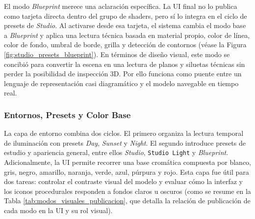 El modo \textit{Blueprint} merece una aclaración específica. La UI final no lo publica como tarjeta directa dentro del grupo de shaders, pero sí lo integra en el ciclo de presets de \textit{Studio}. Al activarse desde esa tarjeta, el sistema cambia el modo base a \textit{Blueprint} y aplica una lectura técnica basada en material propio, color de línea, color de fondo, umbral de borde, grilla y detección de contornos (véase la Figura \ref{fig:studio_presets_blueprint}). En términos de diseño visual, este modo se concibió para convertir la escena en una lectura de planos y siluetas técnicas sin perder la posibilidad de inspección 3D. Por ello funciona como puente entre un lenguaje de representación casi diagramático y el modelo navegable en tiempo real.

\subsubsection{Entornos, Presets y Color Base}

La capa de entorno combina dos ciclos. El primero organiza la lectura temporal de iluminación con presets \textit{Day}, \textit{Sunset} y \textit{Night}. El segundo introduce presets de estudio y apariencia general, entre ellos \textit{Studio}, \texttt{Studio Light} y \textit{Blueprint}. Adicionalmente, la UI permite recorrer una base cromática compuesta por blanco, gris, negro, amarillo, naranja, verde, azul, púrpura y rojo. Esta capa fue útil para dos tareas: controlar el contraste visual del modelo y evaluar cómo la interfaz y los iconos procedurales responden a fondos claros u oscuros (como se resume en la Tabla \ref{tab:modos_visuales_publicacion}, que detalla la relación de publicación de cada modo en la UI y su rol visual).

